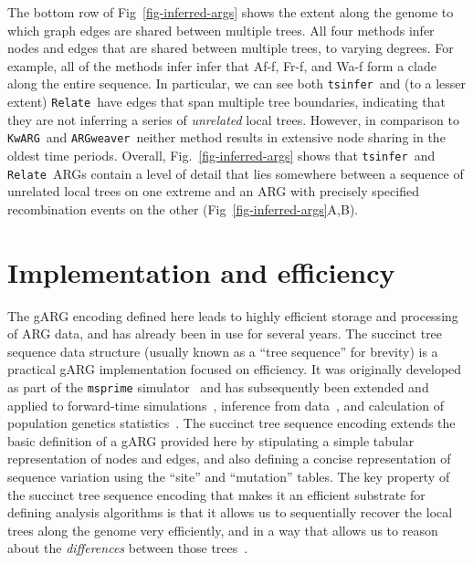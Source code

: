 \documentclass{article}
\newcommand{\noderef}[1]{\textsf{#1}}
\newcommand{\tsinfer}[0]{\texttt{tsinfer}}
\newcommand{\kwarg}[0]{\texttt{KwARG}}
\newcommand{\argweaver}[0]{\texttt{ARGweaver}}
\newcommand{\relate}[0]{\texttt{Relate}}
\begin{document}
The bottom row of Fig~\ref{fig-inferred-args} shows the extent along
the genome to which graph edges are shared between multiple trees.
All four methods infer nodes and edges that are shared between
multiple trees, to varying degrees.
For example, all of the methods infer
infer that \noderef{Af-f}, \noderef{Fr-f}, and \noderef{Wa-f}
form a clade along the entire sequence.
In particular, we can
see both \tsinfer\ and (to a lesser extent) \relate\ have edges
that span multiple tree boundaries, indicating that they are not inferring
a series of \emph{unrelated} local trees.
However, in comparison to \kwarg\ and \argweaver\ neither
method results in extensive node sharing in the
oldest time periods.
Overall, Fig.~\ref{fig-inferred-args} shows
that \tsinfer\ and \relate\ ARGs contain a level of detail
that lies somewhere between a sequence of unrelated local trees on one extreme
and an ARG with precisely specified recombination events on the other
(Fig~\ref{fig-inferred-args}A,B).

\section{Implementation and efficiency}
\label{sec-efficiency}
The gARG encoding defined here
leads to highly efficient storage and processing of ARG data,
and has already been in use for several years.
The succinct tree sequence data structure
(usually known as a ``tree sequence'' for brevity)
is a practical gARG implementation focused on efficiency.
It was originally developed as part of the \texttt{msprime}
simulator~\citep{kelleher2016efficient} and has subsequently been
extended and applied to forward-time
simulations~\citep{kelleher2018efficient,haller2018tree},
inference from data~\citep{kelleher2019inferring,wohns2022unified},
and calculation of population genetics statistics~\citep{ralph2020efficiently}.
The succinct tree sequence encoding extends the basic definition
of a gARG provided here by stipulating a
simple tabular representation of nodes and edges,
and also defining a concise representation of
sequence variation using the ``site'' and  ``mutation'' tables.
The key property of the succinct tree sequence encoding
that makes it an efficient substrate for defining analysis
algorithms is that it allows us to sequentially
recover the local trees along the genome very efficiently,
and in a way that allows us to reason about the \emph{differences}
between those trees~\citep{kelleher2016efficient,ralph2020efficiently}.
\end{document}
